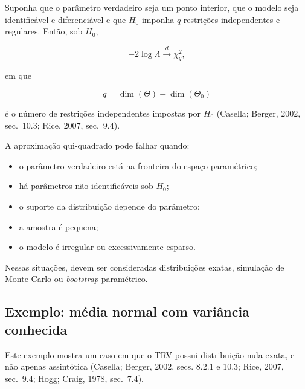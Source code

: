 \documentclass[
  letterpaper,
  DIV=11,
  numbers=noendperiod]{scrreprt}
\providecommand{\tightlist}{%
  \setlength{\itemsep}{0pt}\setlength{\parskip}{0pt}}\usepackage{longtable,booktabs,array}
\begin{document}
Suponha que o parâmetro verdadeiro seja um ponto interior, que o modelo
seja identificável e diferenciável e que \(H_0\) imponha \(q\)
restrições independentes e regulares. Então, sob \(H_0\),

\[-2\log\Lambda
\xrightarrow{d}
\chi^2_q,\]

em que

\[q=\dim(\Theta)-\dim(\Theta_0)\]

é o número de restrições independentes impostas por \(H_0\) (Casella;
Berger, 2002, sec.~10.3; Rice, 2007, sec.~9.4).

\begin{tcolorbox}[enhanced jigsaw, colback=white, leftrule=.75mm, colbacktitle=quarto-callout-warning-color!10!white, breakable, titlerule=0mm, bottomtitle=1mm, title=\textcolor{quarto-callout-warning-color}{\faExclamationTriangle}\hspace{0.5em}{Condições e exceções}, colframe=quarto-callout-warning-color-frame, toprule=.15mm, opacityback=0, bottomrule=.15mm, opacitybacktitle=0.6, arc=.35mm, toptitle=1mm, rightrule=.15mm, coltitle=black, left=2mm]

A aproximação qui-quadrado pode falhar quando:

\begin{itemize}
\tightlist
\item
  o parâmetro verdadeiro está na fronteira do espaço paramétrico;
\item
  há parâmetros não identificáveis sob \(H_0\);
\item
  o suporte da distribuição depende do parâmetro;
\item
  a amostra é pequena;
\item
  o modelo é irregular ou excessivamente esparso.
\end{itemize}

Nessas situações, devem ser consideradas distribuições exatas, simulação
de Monte Carlo ou \emph{bootstrap} paramétrico.

\end{tcolorbox}

\subsection{Exemplo: média normal com variância
conhecida}\label{exemplo-muxe9dia-normal-com-variuxe2ncia-conhecida}

Este exemplo mostra um caso em que o TRV possui distribuição nula exata,
e não apenas assintótica (Casella; Berger, 2002, secs. 8.2.1 e 10.3;
Rice, 2007, sec.~9.4; Hogg; Craig, 1978, sec.~7.4).
\end{document}
